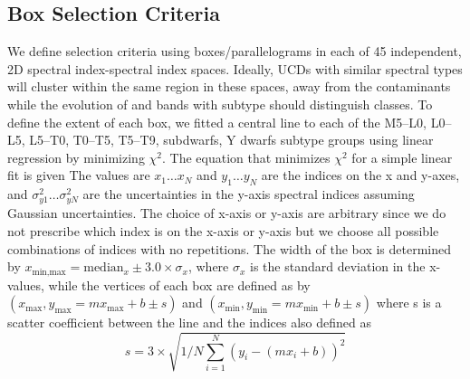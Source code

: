 \documentclass[manuscript]{aastex}
\begin{document}
\subsection{Box Selection Criteria} \label{boxselection}

We define selection criteria using boxes/parallelograms in each of 45 independent, 2D spectral index-spectral index spaces. Ideally, UCDs with similar spectral types will cluster within the same region in these spaces, away from the contaminants while the evolution of \wat and \meth  bands with subtype should distinguish classes. To define the extent of each box, we fitted a central line to each of  the  M5--L0, L0--L5, L5--T0, T0--T5, T5--T9, subdwarfs, Y dwarfs subtype groups using linear regression by minimizing $\chi^2$. The equation that minimizes $\chi^2$ for a simple linear fit is given
 The values are $x_1 \dots x_N$ and   $y_1 \dots y_N$ are the indices on the x and y-axes, and $\sigma^2_{y1} \dots \sigma^2_{yN} $ are the uncertainties in  the y-axis spectral indices assuming Gaussian uncertainties. The choice of x-axis or y-axis are arbitrary since we do not prescribe which index is on the x-axis or y-axis but we choose all possible combinations of indices with no repetitions.  The width of the box is determined by $x_{\text{min}, \text{max}}= \text{median}_x\pm3.0 \times \sigma_x$,  where $ \sigma_x$ is the standard deviation in the x-values, while the vertices of each box are defined as by $(x_{\text{max}}, y_{\text{max}}=mx_{\text{max}}+b \pm s) $ and $(x_{\text{min}}, y_{\text{min}}=mx_{\text{min}}+b \pm s) $ where s is a scatter coefficient between the line and the indices also defined as \begin{equation} s= 3 \times \sqrt{1/N\sum_{i=1}^N (y_i-(m x_i+b))^2} \end{equation} 
\end{document}
